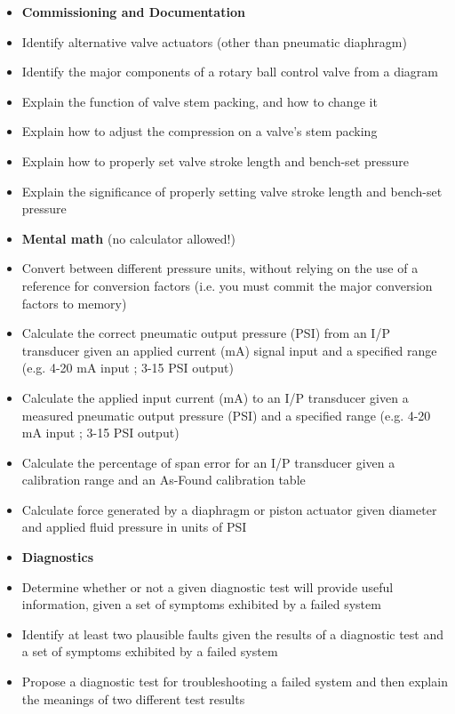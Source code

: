 \filbreak

\begin{itemize}
\item{} {\bf Commissioning and Documentation}
\item{} Identify alternative valve actuators (other than pneumatic diaphragm)
\item{} Identify the major components of a rotary ball control valve from a diagram
\item{} Explain the function of valve stem packing, and how to change it
\item{} Explain how to adjust the compression on a valve's stem packing
\item{} Explain how to properly set valve stroke length and bench-set pressure
\item{} Explain the significance of properly setting valve stroke length and bench-set pressure
\end{itemize}

\filbreak

\begin{itemize}
\item{} {\bf Mental math} (no calculator allowed!)
\item{} Convert between different pressure units, without relying on the use of a reference for conversion factors (i.e. you must commit the major conversion factors to memory)
\item{} Calculate the correct pneumatic output pressure (PSI) from an I/P transducer given an applied current (mA) signal input and a specified range (e.g. 4-20 mA input ; 3-15 PSI output)
\item{} Calculate the applied input current (mA) to an I/P transducer given a measured pneumatic output pressure (PSI) and a specified range (e.g. 4-20 mA input ; 3-15 PSI output) 
\item{} Calculate the percentage of span error for an I/P transducer given a calibration range and an As-Found calibration table 
\item{} Calculate force generated by a diaphragm or piston actuator given diameter and applied fluid pressure in units of PSI
\end{itemize}

\filbreak

\begin{itemize}
\item{} {\bf Diagnostics}
\item{} Determine whether or not a given diagnostic test will provide useful information, given a set of symptoms exhibited by a failed system
\item{} Identify at least two plausible faults given the results of a diagnostic test and a set of symptoms exhibited by a failed system
\item{} Propose a diagnostic test for troubleshooting a failed system and then explain the meanings of two different test results
\end{itemize}



